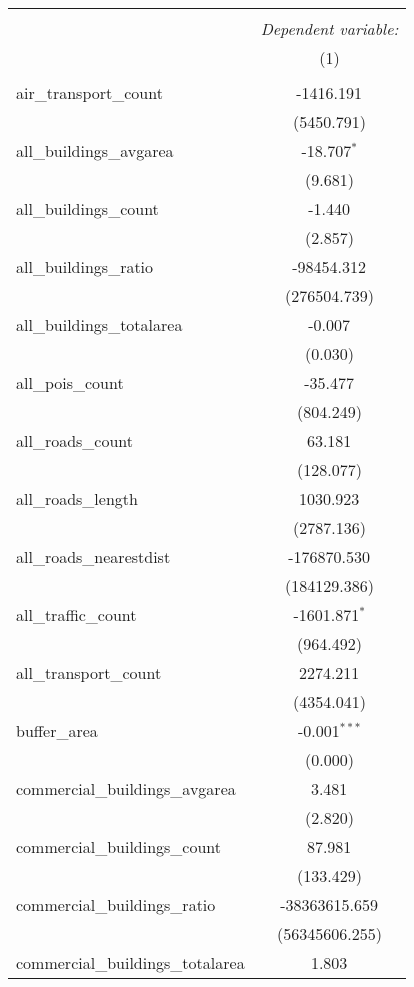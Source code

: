 \begin{table}[!htbp] \centering
\begin{tabular}{@{\extracolsep{5pt}}lc}
\\[-1.8ex]\hline
\hline \\[-1.8ex]
& \multicolumn{1}{c}{\textit{Dependent variable:}} \
\cr \cline{1-2}
\\[-1.8ex] & (1) \\
\hline \\[-1.8ex]
 air_transport_count & -1416.191$^{}$ \\
  & (5450.791) \\
 all_buildings_avgarea & -18.707$^{*}$ \\
  & (9.681) \\
 all_buildings_count & -1.440$^{}$ \\
  & (2.857) \\
 all_buildings_ratio & -98454.312$^{}$ \\
  & (276504.739) \\
 all_buildings_totalarea & -0.007$^{}$ \\
  & (0.030) \\
 all_pois_count & -35.477$^{}$ \\
  & (804.249) \\
 all_roads_count & 63.181$^{}$ \\
  & (128.077) \\
 all_roads_length & 1030.923$^{}$ \\
  & (2787.136) \\
 all_roads_nearestdist & -176870.530$^{}$ \\
  & (184129.386) \\
 all_traffic_count & -1601.871$^{*}$ \\
  & (964.492) \\
 all_transport_count & 2274.211$^{}$ \\
  & (4354.041) \\
 buffer_area & -0.001$^{***}$ \\
  & (0.000) \\
 commercial_buildings_avgarea & 3.481$^{}$ \\
  & (2.820) \\
 commercial_buildings_count & 87.981$^{}$ \\
  & (133.429) \\
 commercial_buildings_ratio & -38363615.659$^{}$ \\
  & (56345606.255) \\
 commercial_buildings_totalarea & 1.803$^{}$ \\

\end{tabular}
\end{table}
